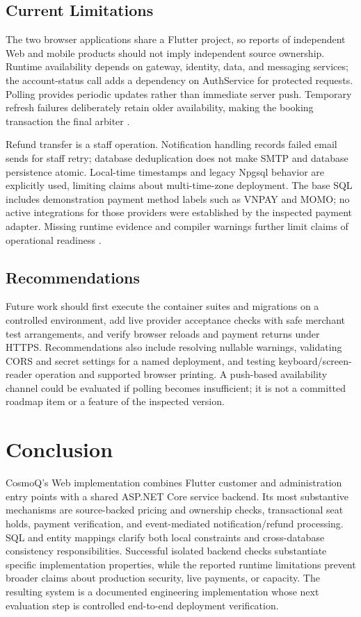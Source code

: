 \documentclass[conference]{IEEEtran}
\begin{document}
\subsection{Current Limitations}
The two browser applications share a Flutter project, so reports of independent
Web and mobile products should not imply independent source ownership. Runtime
availability depends on gateway, identity, data, and messaging services; the
account-status call adds a dependency on AuthService for protected requests.
Polling provides periodic updates rather than immediate server push. Temporary
refresh failures deliberately retain older availability, making the booking
transaction the final arbiter \cite{client,gateway,booking}.

Refund transfer is a staff operation. Notification handling records failed
email sends for staff retry; database deduplication does not make SMTP and
database persistence atomic. Local-time timestamps and legacy Npgsql behavior
are explicitly used, limiting claims about multi-time-zone deployment. The
base SQL includes demonstration payment method labels such as VNPAY and MOMO;
no active integrations for those providers were established by the inspected
payment adapter. Missing runtime evidence and compiler warnings further limit
claims of operational readiness \cite{db,booking,deployment}.

\subsection{Recommendations}
Future work should first execute the container suites and migrations on a
controlled environment, add live provider acceptance checks with safe merchant
test arrangements, and verify browser reloads and payment returns under HTTPS.
Recommendations also include resolving nullable warnings, validating CORS and
secret settings for a named deployment, and testing keyboard/screen-reader
operation and supported browser printing. A push-based availability channel
could be evaluated if polling becomes insufficient; it is not a committed
roadmap item or a feature of the inspected version.

\section{Conclusion}
CosmoQ's Web implementation combines Flutter customer and administration entry
points with a shared ASP.NET Core service backend. Its most substantive
mechanisms are source-backed pricing and ownership checks, transactional seat
holds, payment verification, and event-mediated notification/refund processing.
SQL and entity mappings clarify both local constraints and cross-database
consistency responsibilities. Successful isolated backend checks substantiate
specific implementation properties, while the reported runtime limitations
prevent broader claims about production security, live payments, or capacity.
The resulting system is a documented engineering implementation whose next
evaluation step is controlled end-to-end deployment verification.
\end{document}
